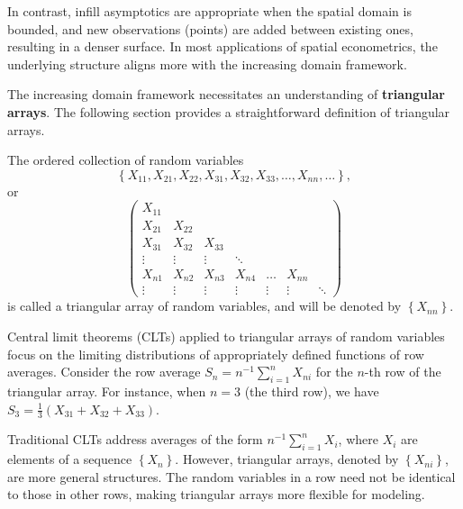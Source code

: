 \documentclass[english,12pt]{book}\usepackage[]{graphicx}\usepackage[]{xcolor}
\begin{document}
In contrast, infill asymptotics are appropriate when the spatial domain is bounded, and new observations (points) are added between existing ones, resulting in a denser surface. In most applications of spatial econometrics, the underlying structure aligns more with the increasing domain framework.

The increasing domain framework necessitates an understanding of \textbf{triangular arrays}. The following section provides a straightforward definition of triangular arrays.

\begin{definition}\label{def:triangular-array} 
The ordered collection of random variables 
\begin{equation*}
\left\lbrace X_{11}, X_{21}, X_{22}, X_{31}, X_{32}, X_{33}, \ldots , X_{nn}, \ldots \right\rbrace,
\end{equation*}
%
or
\begin{equation*}
\begin{pmatrix}
X_{11} &        &        &        &        &        & \\
X_{21} & X_{22} &        &        &        &        & \\
X_{31} & X_{32} & X_{33} &        &        &        & \\
\vdots & \vdots & \vdots & \ddots &        &        & \\
X_{n1} & X_{n2} & X_{n3} & X_{n4} & \hdots & X_{nn} & \\
\vdots & \vdots & \vdots & \vdots & \vdots & \vdots & \ddots
\end{pmatrix}
\end{equation*}
%
is called a triangular array of random variables, and will be denoted by $\left\lbrace X_{nn}\right\rbrace$.
\end{definition}


Central limit theorems (CLTs) applied to triangular arrays of random variables focus on the limiting distributions of appropriately defined functions of row averages. Consider the row average $S_n = n^{-1}\sum_{i=1}^n X_{ni}$ for the $n$-th row of the triangular array. For instance, when $n=3$ (the third row), we have $S_3 = \frac{1}{3}(X_{31} + X_{32} + X_{33})$.

Traditional CLTs address averages of the form $n^{-1}\sum_{i=1}^n X_i$, where $X_i$ are elements of a sequence $\left\lbrace X_n \right\rbrace$. However, triangular arrays, denoted by $\left\lbrace X_{ni} \right\rbrace$, are more general structures. The random variables in a row need not be identical to those in other rows, making triangular arrays more flexible for modeling.
\end{document}
